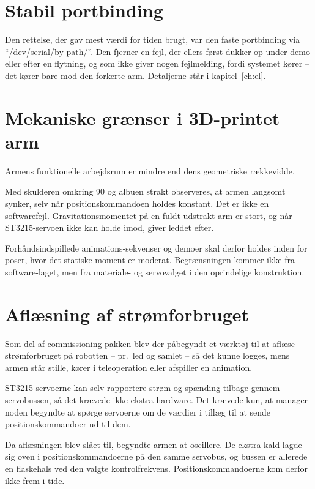 \section{Stabil portbinding}

Den rettelse, der gav mest værdi for tiden brugt, var den faste
portbinding via \enquote{/dev/serial/by-path/}. Den fjerner en
fejl, der ellers først dukker op under demo eller efter en
flytning, og som ikke giver nogen fejlmelding, fordi systemet
kører -- det kører bare mod den forkerte arm. Detaljerne står i
kapitel~\ref{ch:el}.

\section{Mekaniske grænser i 3D-printet arm}

Armens funktionelle arbejdsrum er mindre end dens geometriske
rækkevidde.

Med skulderen omkring 90\textdegree{} og albuen strakt observeres,
at armen langsomt synker, selv når positionskommandoen holdes
konstant. Det er ikke en softwarefejl. Gravitationsmomentet på en
fuldt udstrakt arm er stort, og når ST3215-servoen ikke kan holde
imod, giver leddet efter.

Forhåndsindspillede animations-sekvenser og demoer skal derfor
holdes inden for poser, hvor det statiske moment er moderat.
Begrænsningen kommer ikke fra software-laget, men fra materiale- og
servovalget i den oprindelige konstruktion.

\section{Aflæsning af strømforbruget}

Som del af commissioning-pakken blev der påbegyndt et værktøj til
at aflæse strømforbruget på robotten -- pr.~led og samlet -- så det
kunne logges, mens armen står stille, kører i teleoperation eller
afspiller en animation.

ST3215-servoerne kan selv rapportere strøm og spænding tilbage
gennem servobussen, så det krævede ikke ekstra hardware. Det
krævede kun, at manager-noden begyndte at spørge servoerne om de
værdier i tillæg til at sende positionskommandoer ud til dem.

Da aflæsningen blev slået til, begyndte armen at oscillere. De
ekstra kald lagde sig oven i positionskommandoerne på den samme
servobus, og bussen er allerede en flaskehals ved den valgte
kontrolfrekvens. Positionskommandoerne kom derfor ikke frem i tide.

